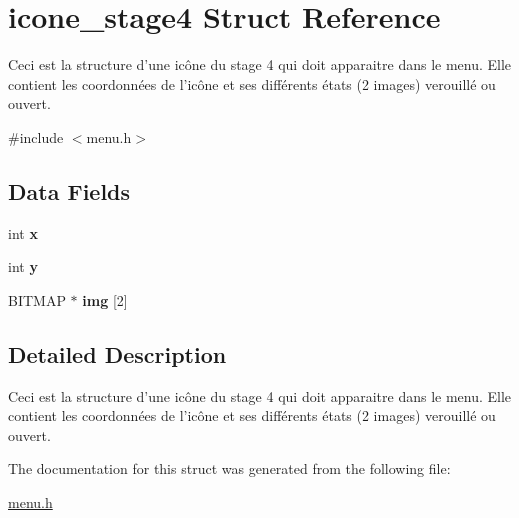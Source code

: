 \hypertarget{structicone__stage4}{\section{icone\-\_\-stage4 Struct Reference}
\label{structicone__stage4}
}


Ceci est la structure d'une icône du stage 4 qui doit apparaitre dans le menu. Elle contient les coordonnées de l'icône et ses différents états (2 images) verouillé ou ouvert.  




{\ttfamily \#include $<$menu.\-h$>$}

\subsection*{Data Fields}
\begin{DoxyCompactItemize}
\item 
\hypertarget{structicone__stage4_a6150e0515f7202e2fb518f7206ed97dc}{int {\bfseries x}}\label{structicone__stage4_a6150e0515f7202e2fb518f7206ed97dc}

\item 
\hypertarget{structicone__stage4_a0a2f84ed7838f07779ae24c5a9086d33}{int {\bfseries y}}\label{structicone__stage4_a0a2f84ed7838f07779ae24c5a9086d33}

\item 
\hypertarget{structicone__stage4_ab1bd34bcded6c8709b926189b4f50c2c}{B\-I\-T\-M\-A\-P $\ast$ {\bfseries img} \mbox{[}2\mbox{]}}\label{structicone__stage4_ab1bd34bcded6c8709b926189b4f50c2c}

\end{DoxyCompactItemize}


\subsection{Detailed Description}
Ceci est la structure d'une icône du stage 4 qui doit apparaitre dans le menu. Elle contient les coordonnées de l'icône et ses différents états (2 images) verouillé ou ouvert. 


\begin{DoxyItemize}
\item 
\end{DoxyItemize}

The documentation for this struct was generated from the following file\-:\begin{DoxyCompactItemize}
\item 
\hyperlink{menu_8h}{menu.\-h}\end{DoxyCompactItemize}
